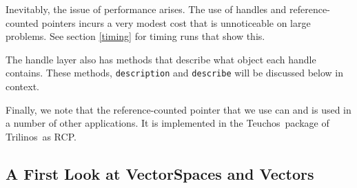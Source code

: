 \documentclass[12pt]{article}
\newcommand{\tri}{{\sf Trilinos}}
\newcommand{\teuchos}{{\sf Teuchos}}
\newcommand{\rcp}{{\sf RCP}}
\renewcommand{\vector}{{\sf Vector}}
\newcommand{\vectorSpace}{{\sf VectorSpace}}
\newcommand{\lcode}[1]{{\tt #1}}
\begin{document}
Inevitably, the issue of performance arises.
The use of handles and reference-counted pointers incurs a very modest
cost that is unnoticeable on large problems.  See section \ref{timing} for
timing runs that show this.

The handle layer also has methods that describe what object each
handle contains.  These methods, \lcode{description} and
\lcode{describe} will be discussed below in context.

Finally, we note that the reference-counted pointer that we use can
and is used in a number of other applications.  It is implemented in
the \teuchos\ package of \tri\ as \rcp.





\subsection{A First Look at \vectorSpace s and \vector s} \label{introVec}
\end{document}
